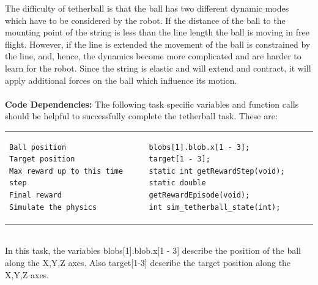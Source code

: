 \documentclass[11pt, article, colorback]{article}
\begin{document}
The difficulty of tetherball is that the ball has two different dynamic modes which have to be considered
by the robot. If the distance of the ball to the mounting point of the string is less than the line length the ball is moving in free flight. 
However, if the line is extended the movement of the ball is constrained by the line, and, hence, the dynamics become more complicated and are harder to learn for 
the robot. Since the string is elastic and will extend and contract, it will apply additional 
forces on the ball which influence its motion. 
\\  \\%
\textbf{Code Dependencies:} The following task specific variables and function calls should be helpful to 
successfully complete the tetherball task. These are: \\
\begin{tabular}{ m{7cm} m{4cm}}
\begin{lstlisting}
Ball position
Target position
Max reward up to this time step
Final reward
Simulate the physics
\end{lstlisting}
& \begin{lstlisting}
blobs[1].blob.x[1 - 3];
target[1 - 3];
static int getRewardStep(void);
static double getRewardEpisode(void);
int sim_tetherball_state(int);
\end{lstlisting}
\end{tabular} \\
In this task, the variables blobs[1].blob.x[1 - 3] describe the position of the ball along the X,Y,Z axes. Also target[1-3] describe the target position 
along the X,Y,Z axes. %
\end{document}
